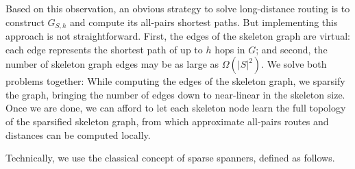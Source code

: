 \documentclass[letterpaper,11pt]{article}
\begin{document}
Based on this observation, an obvious strategy to solve
long-distance routing is  to construct $G_{S,h}$ and 
compute its all-pairs shortest paths. But implementing this approach is not
straightforward. First, the edges of the skeleton graph are virtual: each
edge represents the shortest path of up to $h$ hops in $G$; and
second, the number of skeleton graph edges may be as large as
$\Omega(|S|^2)$. We solve both problems together: While computing the edges of
the skeleton graph, we sparsify the graph, bringing the number of edges
down to near-linear in the skeleton size. Once we are done, we can afford to let  
each skeleton node learn the full topology of the sparsified skeleton
graph, from which approximate all-pairs routes and distances can be computed
locally.

Technically, we use  the classical concept of sparse spanners, defined
as follows.
\end{document}
